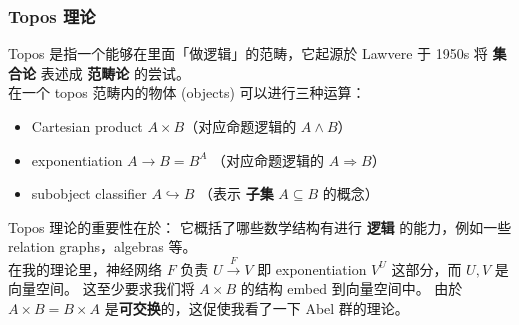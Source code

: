 \documentclass[15pt]{beamer}
\newcommand{\red}[1]{{\color{red}#1}}
\begin{document}
\begin{frame}
\frametitle{Topos 理论}
Topos 是指一个能够在里面「\red{做逻辑}」的范畴，它起源於 Lawvere 于 1950s 将 \textbf{集合论} 表述成 \textbf{范畴论} 的尝试。 \\
在一个 topos 范畴内的物体 (objects) 可以进行三种运算：
\begin{itemize}
	\item Cartesian product $A \times B$（对应命题逻辑的 $A \wedge B$）
	\item exponentiation $A \rightarrow B = B^A$ （对应命题逻辑的 $A \Rightarrow B$）
	\item subobject classifier $A \hookrightarrow B$ （表示 \textbf{子集} $A \subseteq B$ 的概念）
\end{itemize}
Topos 理论的重要性在於： 它概括了哪些数学结构有进行 \textbf{逻辑} 的能力，例如一些 relation graphs，algebras 等。 \\
在我的理论里，神经网络 $F$ 负责 $U \stackrel{F}{\rightarrow} V$ 即 exponentiation $V^U$ 这部分，而 $U, V$ 是向量空间。 这至少要求我们将 $A \times B$ 的结构 embed 到向量空间中。 由於 $A \times B = B \times A$ 是\textbf{可交换}的，这促使我看了一下 Abel 群的理论。
\end{frame}
\end{document}
